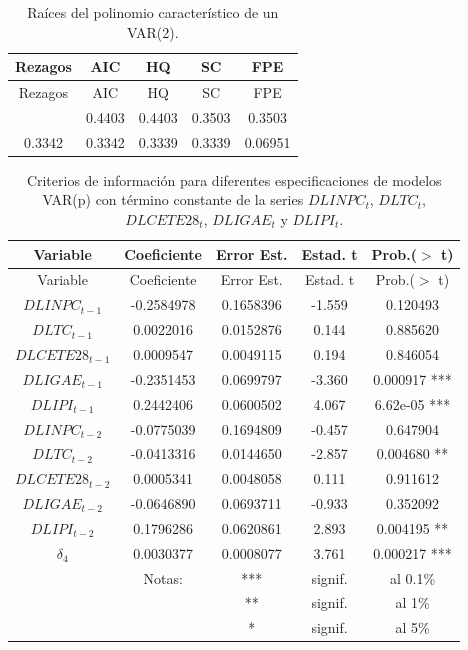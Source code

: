 \documentclass[
]{book}
\begin{document}
\begin{longtable}[]{@{}ccccc@{}}
\caption{\label{tab:RootsVAR} Raíces del polinomio característico de un VAR(2).}\tabularnewline
\toprule\noalign{}
Rezagos & AIC & HQ & SC & FPE \\
\midrule\noalign{}
\endfirsthead
\toprule\noalign{}
Rezagos & AIC & HQ & SC & FPE \\
\midrule\noalign{}
\endhead
\bottomrule\noalign{}
\endlastfoot
0.7452 & 0.4403 & 0.4403 & 0.3503 & 0.3503 \\
0.3342 & 0.3342 & 0.3339 & 0.3339 & 0.06951 \\
\end{longtable}

\begin{longtable}[]{@{}ccccc@{}}
\caption{\label{tab:IGAEVAR} Criterios de información para diferentes especificaciones de modelos VAR(p) con término constante de la series \(DLINPC_t\), \(DLTC_t\), \(DLCETE28_t\), \(DLIGAE_t\) y \(DLIPI_t\).}\tabularnewline
\toprule\noalign{}
Variable & Coeficiente & Error Est. & Estad. t & Prob.(\(>\) t) \\
\midrule\noalign{}
\endfirsthead
\toprule\noalign{}
Variable & Coeficiente & Error Est. & Estad. t & Prob.(\(>\) t) \\
\midrule\noalign{}
\endhead
\bottomrule\noalign{}
\endlastfoot
\(DLINPC_{t-1}\) & -0.2584978 & 0.1658396 & -1.559 & 0.120493 \\
\(DLTC_{t-1}\) & 0.0022016 & 0.0152876 & 0.144 & 0.885620 \\
\(DLCETE28_{t-1}\) & 0.0009547 & 0.0049115 & 0.194 & 0.846054 \\
\(DLIGAE_{t-1}\) & -0.2351453 & 0.0699797 & -3.360 & 0.000917 *** \\
\(DLIPI_{t-1}\) & 0.2442406 & 0.0600502 & 4.067 & 6.62e-05 *** \\
\(DLINPC_{t-2}\) & -0.0775039 & 0.1694809 & -0.457 & 0.647904 \\
\(DLTC_{t-2}\) & -0.0413316 & 0.0144650 & -2.857 & 0.004680 ** \\
\(DLCETE28_{t-2}\) & 0.0005341 & 0.0048058 & 0.111 & 0.911612 \\
\(DLIGAE_{t-2}\) & -0.0646890 & 0.0693711 & -0.933 & 0.352092 \\
\(DLIPI_{t-2}\) & 0.1796286 & 0.0620861 & 2.893 & 0.004195 ** \\
\(\delta_4\) & 0.0030377 & 0.0008077 & 3.761 & 0.000217 *** \\
& Notas: & *** & signif. & al 0.1\% \\
& & ** & signif. & al 1\% \\
& & * & signif. & al 5\% \\
\end{longtable}
\end{document}
